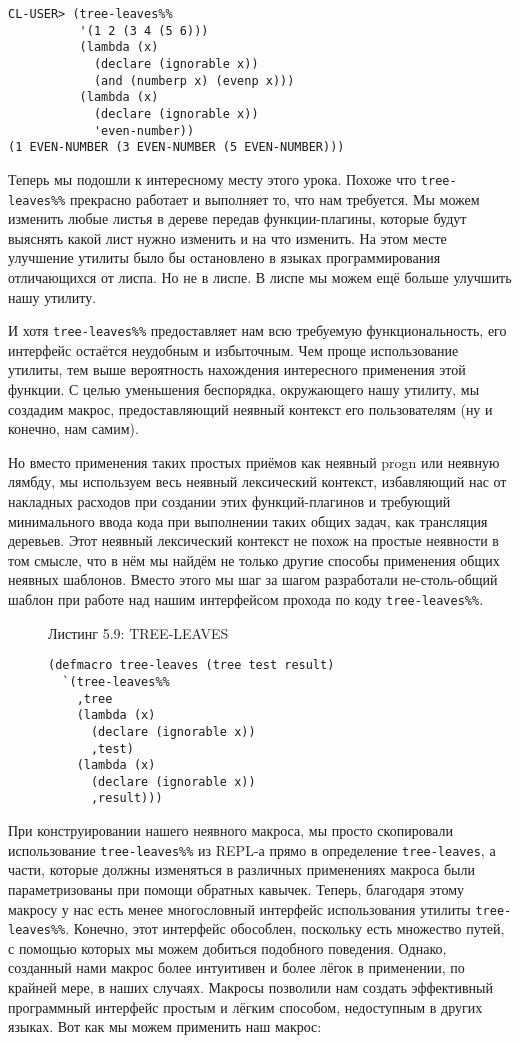\begin{verbatim}
CL-USER> (tree-leaves%%
          '(1 2 (3 4 (5 6)))
          (lambda (x)
            (declare (ignorable x))
            (and (numberp x) (evenp x)))
          (lambda (x)
            (declare (ignorable x))
            'even-number))
(1 EVEN-NUMBER (3 EVEN-NUMBER (5 EVEN-NUMBER)))
\end{verbatim}

Теперь мы подошли к интересному месту этого урока. Похоже что \verb"tree-leaves%%" прекрасно работает и выполняет то, что нам требуется. Мы можем изменить любые листья в дереве передав функции-плагины, которые будут выяснять какой лист нужно изменить и на что изменить. На этом месте улучшение утилиты было бы остановлено в языках программирования отличающихся от лиспа. Но не в лиспе. В лиспе мы можем ещё больше улучшить нашу утилиту.

И хотя \verb"tree-leaves%%" предоставляет нам всю требуемую функциональность, его интерфейс остаётся неудобным и избыточным. Чем проще использование утилиты, тем выше вероятность нахождения интересного применения этой функции. С целью уменьшения беспорядка, окружающего нашу утилиту, мы создадим макрос, предоставляющий неявный контекст его пользователям (ну и конечно, нам самим).

Но вместо применения таких простых приёмов как неявный progn или неявную лямбду, мы используем весь неявный лексический контекст, избавляющий нас от накладных расходов при создании этих функций-плагинов и требующий минимального ввода кода при выполнении таких общих задач, как трансляция деревьев. Этот неявный лексический контекст не похож на простые неявности в том смысле, что в нём мы найдём не только другие способы применения общих неявных шаблонов. Вместо этого мы шаг за шагом разработали не-столь-общий шаблон при работе над нашим интерфейсом прохода по коду \verb"tree-leaves%%".

\begin{figure}Листинг 5.9: TREE-LEAVES\label{listing_5.9}
\listbegin
\begin{verbatim}
(defmacro tree-leaves (tree test result)
  `(tree-leaves%%
    ,tree
    (lambda (x)
      (declare (ignorable x))
      ,test)
    (lambda (x)
      (declare (ignorable x))
      ,result)))
\end{verbatim}
\listend
\end{figure}

При конструировании нашего неявного макроса, мы просто скопировали использование \verb"tree-leaves%%" из REPL-а прямо в определение \verb"tree-leaves", а части, которые должны изменяться в различных применениях макроса были параметризованы при помощи обратных кавычек. Теперь, благодаря этому макросу у нас есть менее многословный интерфейс использования утилиты \verb"tree-leaves%%". Конечно, этот интерфейс обособлен, поскольку есть множество путей, с помощью которых мы можем добиться подобного поведения. Однако, созданный нами макрос более интуитивен и более лёгок в применении, по крайней мере, в наших случаях. Макросы позволили нам создать эффективный программный интерфейс простым и лёгким способом, недоступным в других языках. Вот как мы можем применить наш макрос:


